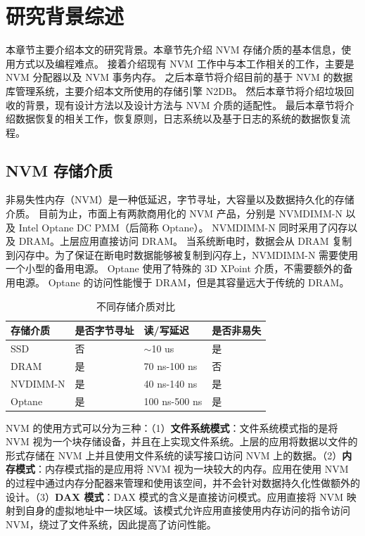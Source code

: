 
\chapter{研究背景综述}

本章节主要介绍本文的研究背景。本章节先介绍 NVM 存储介质的基本信息，使用方式以及编程难点。
接着介绍现有 NVM 工作中与本工作相关的工作，主要是 NVM 分配器以及 NVM 事务内存。
之后本章节将介绍目前的基于 NVM 的数据库管理系统，主要介绍本文所使用的存储引擎 N2DB。
然后本章节将介绍垃圾回收的背景，现有设计方法以及设计方法与 NVM 介质的适配性。
最后本章节将介绍数据恢复的相关工作，恢复原则，日志系统以及基于日志的系统的数据恢复流程。

\section{NVM 存储介质}

非易失性内存（NVM）是一种低延迟，字节寻址，大容量以及数据持久化的存储介质。
目前为止，市面上有两款商用化的 NVM 产品，分别是 NVMDIMM-N 以及 Intel Optane DC PMM（后简称 Optane）。
NVMDIMM-N 同时采用了闪存以及 DRAM。上层应用直接访问 DRAM。
当系统断电时，数据会从 DRAM 复制到闪存中。为了保证在断电时数据能够被复制到闪存上，NVMDIMM-N 需要使用一个小型的备用电源。
Optane 使用了特殊的 3D XPoint 介质，不需要额外的备用电源。
Optane 的访问性能慢于 DRAM，但是其容量远大于传统的 DRAM。

\begin{table}
    \centering
    \caption{不同存储介质对比}
    \begin{tabular}{llll}
        \toprule
        存储介质 & 是否字节寻址 & 读/写延迟     & 是否非易失 \\
        \midrule
        SSD      & 否           & $ \sim $10 us & 是         \\
        DRAM     & 是           & 70 ns-100 ns  & 否         \\
        NVDIMM-N & 是           & 40 ns-140 ns  & 是         \\
        Optane   & 是           & 100 ns-500 ns & 是         \\
        \bottomrule
    \end{tabular}
    \label{tab:nvm}
\end{table}

NVM 的使用方式可以分为三种：（1）\textbf{文件系统模式}：文件系统模式指的是将 NVM 视为一个块存储设备，并且在上实现文件系统。上层的应用将数据以文件的形式存储在 NVM 上并且使用文件系统的读写接口访问 NVM 上的数据。（2）\textbf{内存模式}：内存模式指的是应用将 NVM 视为一块较大的内存。应用在使用 NVM 的过程中通过内存分配器来管理和使用该空间，并不会针对数据持久化性做额外的设计。（3）\textbf{DAX 模式}：DAX 模式的含义是直接访问模式。应用直接将 NVM 映射到自身的虚拟地址中一块区域。该模式允许应用直接使用内存访问的指令访问 NVM，绕过了文件系统，因此提高了访问性能。

